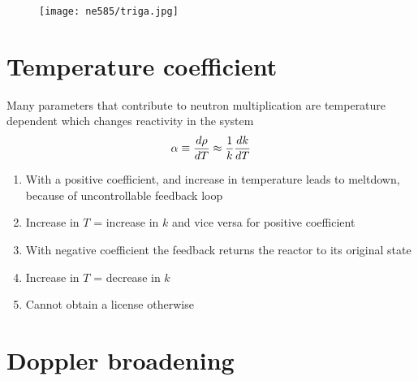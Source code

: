\documentclass[aspectratio=1610,pdftex,dvipsnames,compress,xcolor={dvipsnames}]{beamer}
\begin{document}
\begin{frame}{}
    \begin{figure}
        \centering
        \texttt{[image: ne585/triga.jpg]}
    \end{figure}
\end{frame}


\section{Temperature coefficient}


\addtocounter{framenumber}{-1} 
\begin{frame}{Many parameters that contribute to neutron multiplication are temperature dependent which changes reactivity in the system}
    \begin{equation}
        \LARGE
        \alpha \equiv \frac{d\rho}{dT} \approx \frac{1}{k} \frac{dk}{dT}
    \end{equation}

    \vspace*{\fill}

    \begin{enumerate}[series=outerlist,topsep=0pt,itemsep=21pt,leftmargin=*,label=(\arabic*)]
        \item[]With a positive coefficient, and increase in temperature leads to meltdown, because of uncontrollable feedback loop
        \item[]Increase in $T$ = increase in $k$ and vice versa for positive coefficient
        \item[]With negative coefficient the feedback returns the reactor to its original state
        \item[]Increase in $T$ = decrease in $k$
        \item[]Cannot obtain a license otherwise
    \end{enumerate}
\end{frame}


\section{Doppler broadening}
\end{document}
